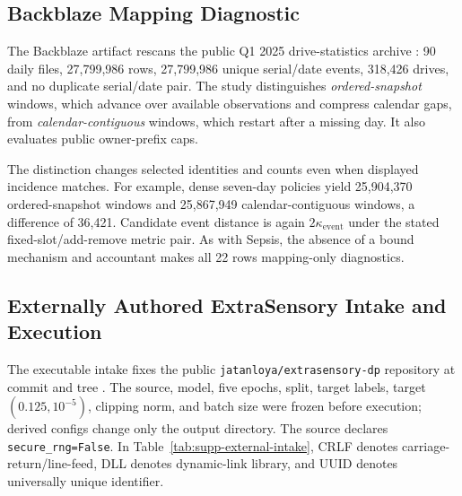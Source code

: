 \documentclass[letterpaper]{article} %
\newcommand{\ke}{\kappa_{\mathrm{event}}}
\begin{document}
\subsection{Backblaze Mapping Diagnostic}

The Backblaze artifact rescans the public Q1 2025 drive-statistics archive
\citep{backblaze_drivestats}: 90 daily files, 27,799,986 rows, 27,799,986
unique serial/date events, 318,426 drives, and no duplicate serial/date pair.
The study distinguishes \emph{ordered-snapshot} windows, which advance over
available observations and compress calendar gaps, from
\emph{calendar-contiguous} windows, which restart after a missing day.  It
also evaluates public owner-prefix caps.

The distinction changes selected identities and counts even when displayed
incidence matches.  For example, dense seven-day policies yield 25,904,370
ordered-snapshot windows and 25,867,949 calendar-contiguous windows, a
difference of 36,421.  Candidate event distance is again $2\ke$ under the
stated fixed-slot/add-remove metric pair.  As with Sepsis, the absence of a
bound mechanism and accountant makes all 22 rows mapping-only diagnostics.

\subsection{Externally Authored ExtraSensory Intake and Execution}

The executable intake fixes the public
\texttt{jatanloya/extrasensory-dp} repository at commit
\texttt{} and tree
\texttt{}
\citep{extrasensorydp,vaizman2017extrasensory}.  The source, model, five epochs, split, target labels,
target $(0.125,10^{-5})$, clipping norm, and batch size were frozen before
execution; derived configs change only the output directory.  The source
declares \texttt{secure\_rng=False}.  In Table~\ref{tab:supp-external-intake},
CRLF denotes carriage-return/line-feed, DLL denotes dynamic-link library, and
UUID denotes universally unique identifier.
\end{document}
